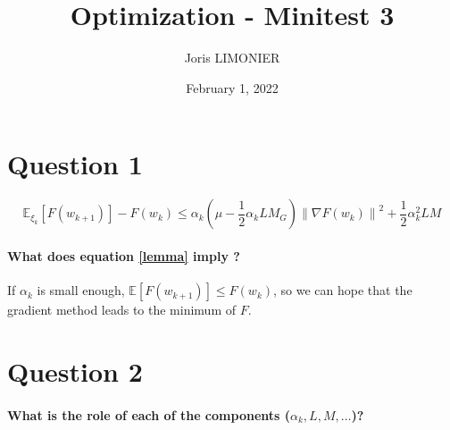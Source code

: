 \documentclass{article}
\title{Optimization - Minitest 3}
\author{Joris LIMONIER}
\date{February 1, 2022}
\newcommand{\E}{\mathbb{E}}
\newcommand{\1}{\mathbf{1}}
\begin{document}
\maketitle

\section*{Question 1}
\begin{equation}
  \label{lemma}
  \E_{\xi_k}\left[F(w_{k+1})\right] - F(w_k) \leq \alpha_k \left(\mu - \frac{1}{2} \alpha_k L M_G\right) \left\| \nabla F(w_k)\right\|^2 + \frac{1}{2} \alpha_k^2 LM
\end{equation}
\paragraph{What does equation \eqref{lemma} imply ?}
If \(\alpha_k\) is small enough, \(\E\left[F(w_{k+1})\right] \leq F(w_k)\), so we can hope that the gradient method leads to the minimum of \(F\).

\section*{Question 2}
\paragraph{What is the role of each of the components (\(\alpha_k, L, M, \ldots\))?}
\end{document}

